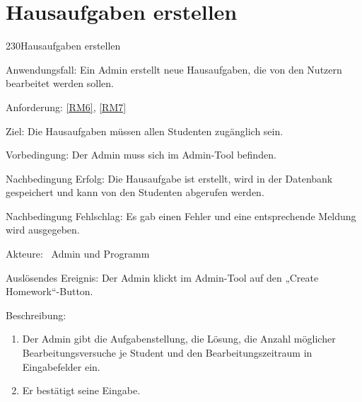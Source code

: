 \section{Hausaufgaben erstellen}
\begin{function}{230}{Hausaufgaben erstellen}
\item[Anwendungsfall:] Ein Admin erstellt neue Hausaufgaben, die von den Nutzern bearbeitet werden sollen.
\item[Anforderung:] \ref{RM6}, \ref{RM7}
\item[Ziel:] Die Hausaufgaben müssen allen Studenten zugänglich sein.
\item[Vorbedingung:] Der Admin muss sich im Admin-Tool befinden.
\item[Nachbedingung Erfolg:]  Die Hausaufgabe ist erstellt, wird in der Datenbank gespeichert und kann von den Studenten abgerufen werden.
\item[Nachbedingung Fehlschlag:] Es gab einen Fehler und eine entsprechende Meldung wird ausgegeben. 
\item[Akteure:] ~Admin und Programm
\item[Auslösendes Ereignis:] Der Admin klickt im Admin-Tool auf den „Create Homework“-Button.
\item[Beschreibung:] ~
\begin{enumerate}
  \item  Der Admin gibt die Aufgabenstellung, die Lösung, die Anzahl möglicher Bearbeitungsversuche je Student und den Bearbeitungszeitraum in Eingabefelder ein.
  \item  Er bestätigt seine Eingabe.
\end{enumerate}
\end{function}
